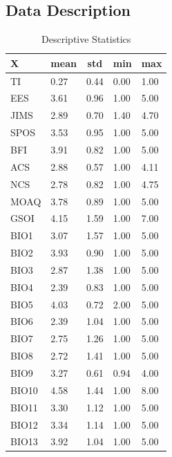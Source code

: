 \documentclass[
  man]{apa7}
\begin{document}
\hypertarget{data-description}{%
\subsection{Data Description}\label{data-description}}

\begin{table}[tbp]

\begin{center}
\begin{threeparttable}

\caption{\label{tab:study2descr}Descriptive Statistics}

\begin{tabular}{lllll}
\toprule
X & \multicolumn{1}{c}{mean} & \multicolumn{1}{c}{std} & \multicolumn{1}{c}{min} & \multicolumn{1}{c}{max}\\
\midrule
TI & 0.27 & 0.44 & 0.00 & 1.00\\
EES & 3.61 & 0.96 & 1.00 & 5.00\\
JIMS & 2.89 & 0.70 & 1.40 & 4.70\\
SPOS & 3.53 & 0.95 & 1.00 & 5.00\\
BFI & 3.91 & 0.82 & 1.00 & 5.00\\
ACS & 2.88 & 0.57 & 1.00 & 4.11\\
NCS & 2.78 & 0.82 & 1.00 & 4.75\\
MOAQ & 3.78 & 0.89 & 1.00 & 5.00\\
GSOI & 4.15 & 1.59 & 1.00 & 7.00\\
BIO1 & 3.07 & 1.57 & 1.00 & 5.00\\
BIO2 & 3.93 & 0.90 & 1.00 & 5.00\\
BIO3 & 2.87 & 1.38 & 1.00 & 5.00\\
BIO4 & 2.39 & 0.83 & 1.00 & 5.00\\
BIO5 & 4.03 & 0.72 & 2.00 & 5.00\\
BIO6 & 2.39 & 1.04 & 1.00 & 5.00\\
BIO7 & 2.75 & 1.26 & 1.00 & 5.00\\
BIO8 & 2.72 & 1.41 & 1.00 & 5.00\\
BIO9 & 3.27 & 0.61 & 0.94 & 4.00\\
BIO10 & 4.58 & 1.44 & 1.00 & 8.00\\
BIO11 & 3.30 & 1.12 & 1.00 & 5.00\\
BIO12 & 3.34 & 1.14 & 1.00 & 5.00\\
BIO13 & 3.92 & 1.04 & 1.00 & 5.00\\
\bottomrule
\end{tabular}

\end{threeparttable}
\end{center}

\end{table}
\end{document}
